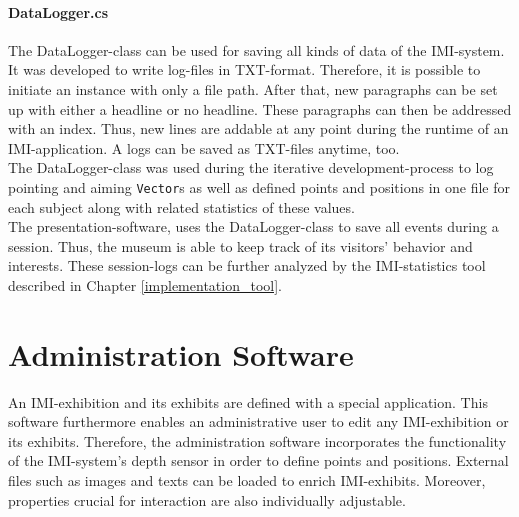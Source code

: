 
\paragraph{DataLogger.cs} The DataLogger-class can be used for saving all kinds of data of the \ac{IMI}-system. It was developed to write log-files in TXT-format. Therefore, it is possible to initiate an instance with only a file path. After that, new paragraphs can be set up with either a headline or no headline. These paragraphs can then be addressed with an index. Thus, new lines are addable at any point during the runtime of an \ac{IMI}-application. A logs can be saved as TXT-files anytime, too.
\\
The DataLogger-class was used during the iterative development-process to log pointing and aiming \texttt{Vector}s as well as defined points and positions in one file for each subject along with related statistics of these values.
\\
The presentation-software, uses the DataLogger-class to save all events during a session. Thus, the museum is able to keep track of its visitors' behavior and interests. These session-logs can be further analyzed by the \ac{IMI}-statistics tool described in Chapter \ref{implementation_tool}.


\section{Administration Software}
\label{implementation_administration}

An \ac{IMI}-exhibition and its exhibits are defined with a special application. This software furthermore enables an administrative user to edit any \ac{IMI}-exhibition or its exhibits. Therefore, the administration software incorporates the functionality of the \ac{IMI}-system's depth sensor in order to define points and positions. External files such as images and texts can be loaded to enrich \ac{IMI}-exhibits. Moreover, properties crucial for interaction are also individually adjustable.

